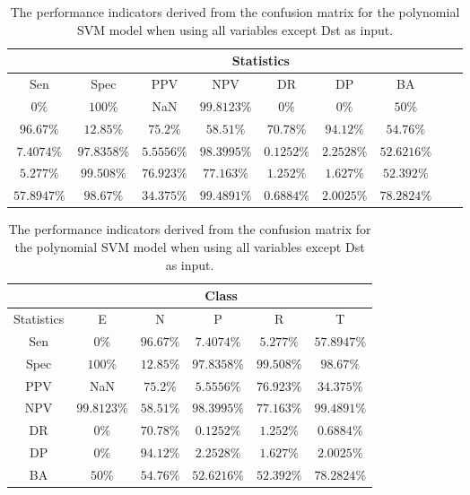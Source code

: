 \begin{table}[!ht]
	\centering
	\begin{tabular}{|c|c|c|c|c|c|c|c|c|}
		\hline
		 & \multicolumn{7}{c|}{Statistics} \\ \hline
		Sen & Spec & PPV & NPV & DR & DP & BA \\ \hline
		$0\%$ & $100\%$ & NaN & $99.8123\%$ & $0\%$ & $0\%$ & $50\%$ \\ \hline
		$96.67\%$ & $12.85\%$ & $75.2\%$ & $58.51\%$ & $70.78\%$ & $94.12\%$ & $54.76\%$ \\ \hline
		$7.4074\%$ & $97.8358\%$ & $5.5556\%$ & $98.3995\%$ & $0.1252\%$ & $2.2528\%$ & $52.6216\%$ \\ \hline
		$5.277\%$ & $99.508\%$ & $76.923\%$ & $77.163\%$ & $1.252\%$ & $1.627\%$ & $52.392\%$ \\ \hline
		$57.8947\%$ & $98.67\%$ & $34.375\%$ & $99.4891\%$ & $0.6884\%$ & $2.0025\%$ & $78.2824\%$ \\ \hline
	\end{tabular}
	\caption{The performance indicators derived from the confusion matrix for the polynomial SVM model when using all variables except Dst as input.}
	\label{tab:cs:noDst:svmPoly}
\end{table}

\begin{table}[!ht]
	\centering
	\begin{tabular}{|c|c|c|c|c|c|}
		\hline
		 & \multicolumn{5}{c|}{Class} \\ \hline
		Statistics & E & N & P & R & T \\ \hline
		Sen & $0\%$ & $96.67\%$ & $7.4074\%$ & $5.277\%$ & $57.8947\%$ \\ \hline
		Spec & $100\%$ & $12.85\%$ & $97.8358\%$ & $99.508\%$ & $98.67\%$ \\ \hline
		PPV & NaN & $75.2\%$ & $5.5556\%$ & $76.923\%$ & $34.375\%$ \\ \hline
		NPV & $99.8123\%$ & $58.51\%$ & $98.3995\%$ & $77.163\%$ & $99.4891\%$ \\ \hline
		DR & $0\%$ & $70.78\%$ & $0.1252\%$ & $1.252\%$ & $0.6884\%$ \\ \hline
		DP & $0\%$ & $94.12\%$ & $2.2528\%$ & $1.627\%$ & $2.0025\%$ \\ \hline
		BA & $50\%$ & $54.76\%$ & $52.6216\%$ & $52.392\%$ & $78.2824\%$ \\ \hline
	\end{tabular}
	\caption{The performance indicators derived from the confusion matrix for the polynomial SVM model when using all variables except Dst as input.}
	\label{tab:cs:reverse:noDst:svmPoly}
\end{table}
